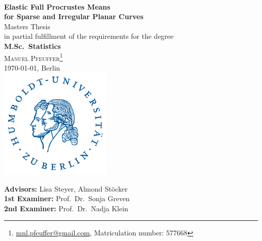 \documentclass[a4paper,12pt,english,headings=small]{scrreprt}
\theoremstyle{plain}
\theoremstyle{definition}
\theoremstyle{remark}
\theoremstyle{plain}
\begin{document}

\begin{titlepage}
  \begin{center}
  \\
  \vspace{1.66cm}
    {\LARGE\sffamily\textbf{Elastic Full Procrustes Means\vspace{0.5cm}\\
    for Sparse and Irregular Planar Curves}}
  \vspace{1.2cm}\\
    {\large Masters Thesis}\\
    in partial fulfillment of the requirements for the degree\\
    \textbf{M.Sc.\ Statistics}
  \vspace{1.2cm}\\
  \textsc{\large Manuel Pfeuffer\footnote{\url{mnl.pfeuffer@gmail.com}, Matriculation number: 577668}}\\
  \today, Berlin
  \vspace{2.0cm}\\
    \includegraphics[width=0.4\textwidth]{graphics/hulogo.pdf}
  \vspace{0.5cm}\\

  \vfill
  \end{center}

  \noindent \textbf{Advisors:} Lisa Steyer, Almond Stöcker\\
  \noindent \textbf{1st Examiner:} Prof.\ Dr.\ Sonja Greven\\
  \noindent \textbf{2nd Examiner:} Prof.\ Dr.\ Nadja Klein
  \vspace{0.5em}

\end{titlepage}

\tableofcontents
\end{document}
